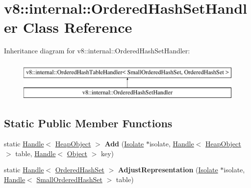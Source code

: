\hypertarget{classv8_1_1internal_1_1OrderedHashSetHandler}{}\section{v8\+:\+:internal\+:\+:Ordered\+Hash\+Set\+Handler Class Reference}
\label{classv8_1_1internal_1_1OrderedHashSetHandler}
Inheritance diagram for v8\+:\+:internal\+:\+:Ordered\+Hash\+Set\+Handler\+:\begin{figure}[H]
\begin{center}
\leavevmode
\includegraphics[height=2.000000cm]{classv8_1_1internal_1_1OrderedHashSetHandler}
\end{center}
\end{figure}
\subsection*{Static Public Member Functions}
\begin{DoxyCompactItemize}
\item 
\mbox{\label{classv8_1_1internal_1_1OrderedHashSetHandler_a2de12f42cfe4c32cf3def03d5682966c}} 
static \mbox{\hyperlink{classv8_1_1internal_1_1Handle}{Handle}}$<$ \mbox{\hyperlink{classv8_1_1internal_1_1HeapObject}{Heap\+Object}} $>$ {\bfseries Add} (\mbox{\hyperlink{classv8_1_1internal_1_1Isolate}{Isolate}} $\ast$isolate, \mbox{\hyperlink{classv8_1_1internal_1_1Handle}{Handle}}$<$ \mbox{\hyperlink{classv8_1_1internal_1_1HeapObject}{Heap\+Object}} $>$ table, \mbox{\hyperlink{classv8_1_1internal_1_1Handle}{Handle}}$<$ \mbox{\hyperlink{classv8_1_1internal_1_1Object}{Object}} $>$ key)
\item 
\mbox{\label{classv8_1_1internal_1_1OrderedHashSetHandler_ad7a4f6aae266ffc0e2b022847049ab5e}} 
static \mbox{\hyperlink{classv8_1_1internal_1_1Handle}{Handle}}$<$ \mbox{\hyperlink{classv8_1_1internal_1_1OrderedHashSet}{Ordered\+Hash\+Set}} $>$ {\bfseries Adjust\+Representation} (\mbox{\hyperlink{classv8_1_1internal_1_1Isolate}{Isolate}} $\ast$isolate, \mbox{\hyperlink{classv8_1_1internal_1_1Handle}{Handle}}$<$ \mbox{\hyperlink{classv8_1_1internal_1_1SmallOrderedHashSet}{Small\+Ordered\+Hash\+Set}} $>$ table)
\end{DoxyCompactItemize}
